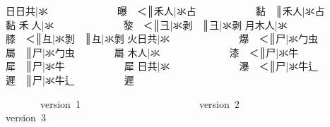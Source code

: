 {\cjk{}{\cnsym{}　　　}日日共}|{\cjk{}氺{\cnsym{}　　　　　　　}曝{\cnsym{}　}＜}║{\cjk{}{\cnsym{}　　　　　}禾人}|{\cjk{}氺占{\cnsym{}　　　　　　}黏{\cnsym{}　}}║{\cjk{}{\cnsym{}　　　　　　}禾人}|{\cjk{}氺占{\cnsym{}　　　　　　}黏} 
{\cjk{}{\cnsym{}　　　}禾{\cnjzr{}}人}|{\cjk{}氺{\cnsym{}　　　　　　　}黎{\cnsym{}　}＜}║{\cjk{}{\cnsym{}　　　　　　}彐}|{\cjk{}氺剥{\cnsym{}　}}║{\cjk{}{\cnsym{}　　　　　　　}彐}|{\cjk{}氺剥} 
{\cjk{}{\cnsym{}　　　}月木人}|{\cjk{}氺{\cnsym{}　　　　　　　}膝{\cnsym{}　}＜}║{\cjk{}{\cnsym{}　　　　　　}彑}|{\cjk{}氺剝{\cnsym{}　}}║{\cjk{}{\cnsym{}　　　　　　　}彑}|{\cjk{}氺剝} 
{\cjk{}{\cnsym{}　　　}火日共}|{\cjk{}氺{\cnsym{}　　　　　　　}爆{\cnsym{}　}＜}║{\cjk{}{\cnsym{}　　　　　　}尸}|{\cjk{}氺勹虫{\cnsym{}　　　　}屬{\cnsym{}　}}║{\cjk{}{\cnsym{}　　　　　　　}尸}|{\cjk{}氺勹虫{\cnsym{}　　　　}屬} 
{\cjk{}{\cnsym{}　　　}木人}|{\cjk{}氺{\cnsym{}　　　　　　　}漆{\cnsym{}　}＜}║{\cjk{}{\cnsym{}　　　　　　}尸}|{\cjk{}氺牛{\cnsym{}　　　　　　}犀{\cnsym{}　}}║{\cjk{}{\cnsym{}　　　　　　　}尸}|{\cjk{}氺牛{\cnsym{}　　　　　　}犀} 
{\cjk{}{\cnsym{}　　　}日共}|{\cjk{}氺{\cnsym{}　　　　　　　}瀑{\cnsym{}　}＜}║{\cjk{}{\cnsym{}　　　　　　}尸}|{\cjk{}氺牛辶{\cnsym{}　　　　　}遲{\cnsym{}　}}║{\cjk{}{\cnsym{}　　　　　　　}尸}|{\cjk{}氺牛辶{\cnsym{}　　　　　}遲} 
\endgroup{}{}

\endgroup{}\begin{multicols}{2}\end{multicols}\begingroup\mktsObeyAllLines{}

\begingroup\mktsStyleCode{}       version 1                        version 2                        version 3

